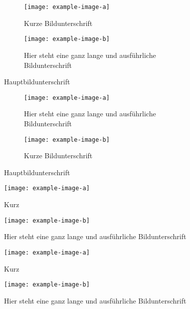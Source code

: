 \documentclass{scrartcl}
\begin{document}
\begin{figure}
	\centering
	\hfil
	\begin{subfigure}[t]{0.4\textwidth}
		\texttt{[image: example-image-a]}
		\caption{Kurze Bildunterschrift}
	\end{subfigure}
	\hfil
	\begin{subfigure}[t]{0.4\textwidth}
		\centering
		\texttt{[image: example-image-b]}
		\caption{Hier steht eine ganz lange und ausführliche Bildunterschrift}
	\end{subfigure}
	\hfil
	\caption{Hauptbildunterschrift}
\end{figure}


\begin{figure}
	\centering
	\hfil
	\begin{subfigure}[t]{0.4\textwidth}
		\centering
		\texttt{[image: example-image-a]}
		\caption{Hier steht eine ganz lange und ausführliche Bildunterschrift}
	\end{subfigure}
	\hfil
	\begin{subfigure}[t]{0.4\textwidth}
		\centering
		\texttt{[image: example-image-b]}
		\caption{Kurze Bildunterschrift}
	\end{subfigure}
	\hfil
	\caption{Hauptbildunterschrift}
\end{figure}

\clearpage

\begin{figure}
	\centering
	\begin{minipage}[t]{0.4\textwidth}
		\centering
		\texttt{[image: example-image-a]}
		\caption{Kurz}
	\end{minipage}%
	\hfil
	\begin{minipage}[t]{0.4\textwidth}
		\centering
		\texttt{[image: example-image-b]}
		\caption{Hier steht eine ganz lange und ausführliche Bildunterschrift}
	\end{minipage}
\end{figure}

\begin{figure}
	\centering
	\begin{minipage}[t]{0.4\textwidth}
		\centering
		\texttt{[image: example-image-a]}
		\caption{Kurz}
	\end{minipage}%
	\hfil
	\begin{minipage}[t]{0.4\textwidth}
		\centering
		\texttt{[image: example-image-b]}
		\caption{Hier steht eine ganz lange und ausführliche Bildunterschrift}
	\end{minipage}
\end{figure}
\end{document}
